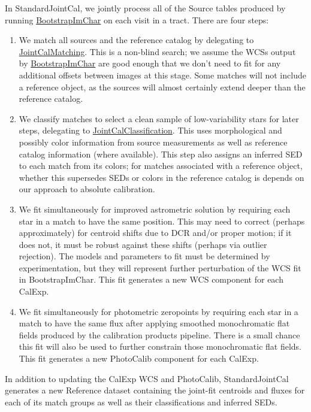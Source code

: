 In StandardJointCal, we jointly process all of the Source tables produced by running \hyperref[sec:drpBootstrapImChar]{BootstrapImChar} on each visit in a tract.  There are four steps:
\begin{enumerate}
\item We match all sources and the reference catalog by delegating to \hyperref[sec:acJointCalMatching]{JointCalMatching}.  This is a non-blind search; we assume the WCSs output by \hyperref[sec:drpBootstrapImChar]{BootstrapImChar} are good enough that we don't need to fit for any additional offsets between images at this stage.  Some matches will not include a reference object, as the sources will almost certainly extend deeper than the reference catalog.
\item We classify matches to select a clean sample of low-variability stars for later steps, delegating to \hyperref[sec:acJointCalClassification]{JointCalClassification}.  This uses morphological and possibly color information from source measurements as well as reference catalog information (where available).  This step also assigns an inferred SED to each match from its colors; for matches associated with a reference object, whether this supersedes SEDs or colors in the reference catalog is depends on our approach to absolute calibration.
\item We fit simultaneously for improved astrometric solution by requiring each star in a match to have the same position.  This may need to correct (perhaps approximately) for centroid shifts due to DCR and/or proper motion; if it does not, it must be robust against these shifts (perhaps via outlier rejection).  The models and parameters to fit must be determined by experimentation, but they will represent further perturbation of the WCS fit in BootstrapImChar.  This fit generates a new WCS component for each CalExp.
\item We fit simultaneously for photometric zeropoints by requiring each star in a match to have the same flux after applying smoothed monochromatic flat fields produced by the calibration products pipeline.  There is a small chance this fit will also be used to further constrain those monochromatic flat fields.  This fit generates a new PhotoCalib component for each CalExp.
\end{enumerate}

In addition to updating the CalExp WCS and PhotoCalib, StandardJointCal generates a new Reference dataset containing the joint-fit centroids and fluxes for each of its match groups as well as their classifications and inferred SEDs.

